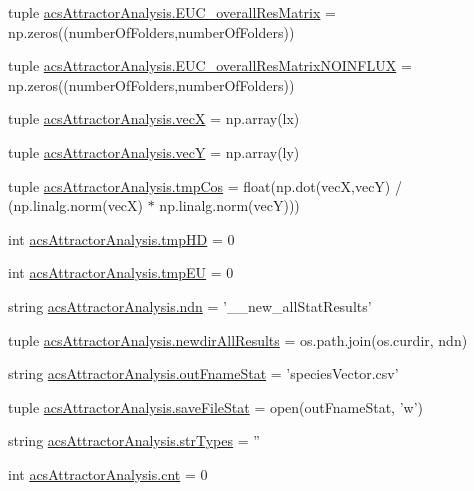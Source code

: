 \begin{DoxyCompactItemize}
tuple \hyperlink{a00090_a920167afed4efad8feefc27bdbadba89}{acs\-Attractor\-Analysis.\-E\-U\-C\-\_\-overall\-Res\-Matrix} = np.\-zeros((number\-Of\-Folders,number\-Of\-Folders))
\item 
tuple \hyperlink{a00090_a4214c876be4247f0643fc749beb35787}{acs\-Attractor\-Analysis.\-E\-U\-C\-\_\-overall\-Res\-Matrix\-N\-O\-I\-N\-F\-L\-U\-X} = np.\-zeros((number\-Of\-Folders,number\-Of\-Folders))
\item 
tuple \hyperlink{a00090_af20e9c92b7d977049b881882c0d1382c}{acs\-Attractor\-Analysis.\-vec\-X} = np.\-array(lx)
\item 
tuple \hyperlink{a00090_a691fb5bd87af2162b5acaf48ea4c06e7}{acs\-Attractor\-Analysis.\-vec\-Y} = np.\-array(ly)
\item 
tuple \hyperlink{a00090_a305669433b259c5ffcb797769e7c30df}{acs\-Attractor\-Analysis.\-tmp\-Cos} = float(np.\-dot(vec\-X,vec\-Y) / (np.\-linalg.\-norm(vec\-X) $\ast$ np.\-linalg.\-norm(vec\-Y)))
\item 
int \hyperlink{a00090_a1fe1582f1d1dc5f55558d25c8eb30ad7}{acs\-Attractor\-Analysis.\-tmp\-H\-D} = 0
\item 
int \hyperlink{a00090_a0c4860774229747cda9dabe70614abc6}{acs\-Attractor\-Analysis.\-tmp\-E\-U} = 0
\item 
string \hyperlink{a00090_a109ce3a379d650b3f9b08debc0433a19}{acs\-Attractor\-Analysis.\-ndn} = '\-\_\-\_\-new\-\_\-all\-Stat\-Results'
\item 
tuple \hyperlink{a00090_ae620f985669aed90dc070824420d4b5e}{acs\-Attractor\-Analysis.\-newdir\-All\-Results} = os.\-path.\-join(os.\-curdir, ndn)
\item 
string \hyperlink{a00090_aeecfcdefbc44b2b2ceff4c9b6f737f27}{acs\-Attractor\-Analysis.\-out\-Fname\-Stat} = 'species\-Vector.\-csv'
\item 
tuple \hyperlink{a00090_acc1016f353d0e1b36c837cb0b480edef}{acs\-Attractor\-Analysis.\-save\-File\-Stat} = open(out\-Fname\-Stat, 'w')
\item 
string \hyperlink{a00090_ae5f324ca114055fca79473eecd17bb80}{acs\-Attractor\-Analysis.\-str\-Types} = ''
\item 
int \hyperlink{a00090_a8ec106a228fafb4c290946a7b7f8b6da}{acs\-Attractor\-Analysis.\-cnt} = 0
\end{DoxyCompactItemize}
